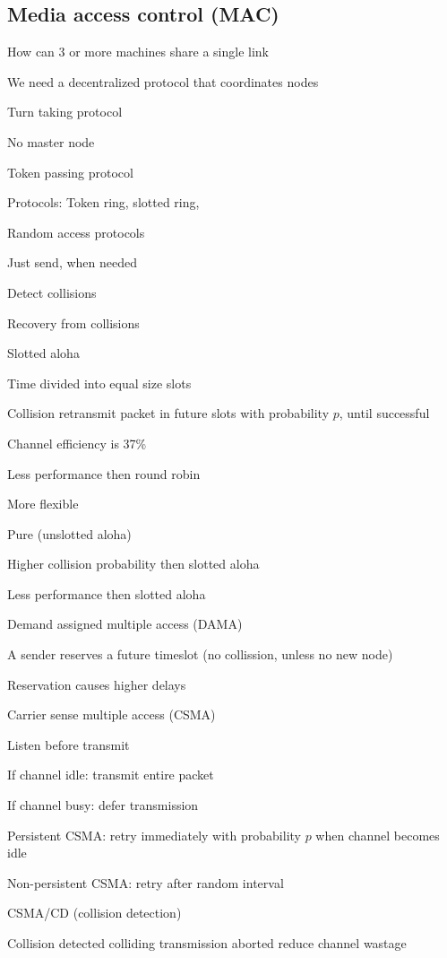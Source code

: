 \subsection{Media access control (MAC)}
\enumstart
	\item How can 3 or more machines share a single link
	\item We need a decentralized protocol that coordinates nodes
	\item Turn taking protocol
	\enumstart
		\item No master node
		\item Token passing protocol
		\item Protocols: Token ring, slotted ring, \ddd
	\enumend
	\item Random access protocols
	\enumstart
		\item Just send, when needed
		\item Detect collisions
		\item Recovery from collisions
		\item Slotted aloha
		\enumstart
			\item Time divided into equal size slots
			\item Collision \arrow retransmit packet in future slots with probability $p$, until successful
			\item Channel efficiency is 37\%
			\item Less performance then round robin
			\item More flexible
		\enumend
		\item Pure (unslotted aloha)
		\enumstart
			\item Higher collision probability then slotted aloha
			\item Less performance then slotted aloha
		\enumend
		\item Demand assigned multiple access (DAMA)
		\enumstart
			\item A sender reserves a future timeslot (no collission, unless no new node)
			\item Reservation causes higher delays
		\enumend
		\item Carrier sense multiple access (CSMA)
		\enumstart
			\item Listen before transmit
			\item If channel idle: transmit entire packet
			\item If channel busy: defer transmission
			\enumstart
				\item Persistent CSMA: retry immediately with probability $p$ when channel becomes idle
				\item Non-persistent CSMA: retry after random interval
			\enumend
		\enumend
		\item CSMA/CD (collision detection)
		\enumstart
			\item Collision detected \arrow colliding transmission aborted \arrow reduce channel wastage
		\enumend
	\enumend
\enumend

